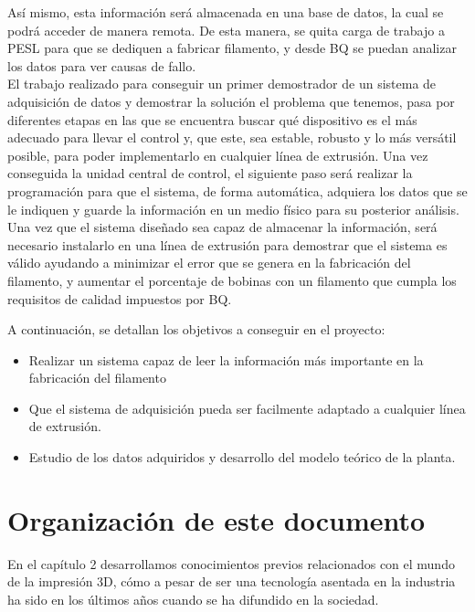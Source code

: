Así mismo, esta información será almacenada en una base de datos, la cual se podrá acceder de manera remota. De esta manera, se quita carga de trabajo a PESL para que se dediquen a fabricar filamento, y desde BQ se puedan analizar los datos para ver causas de fallo.\\

El trabajo realizado para conseguir un primer demostrador de un sistema de adquisición de datos y demostrar la solución el problema que tenemos, pasa por diferentes etapas en las que se encuentra buscar qué dispositivo es el más adecuado para llevar el control y, que este, sea estable, robusto y lo más versátil posible, para poder implementarlo en cualquier línea de extrusión. Una vez conseguida la unidad central de control, el siguiente paso será realizar la programación para que el sistema, de forma automática, adquiera los datos que se le indiquen y guarde la información en un medio físico para su posterior análisis.\\

Una vez que el sistema diseñado sea capaz de almacenar la información, será necesario instalarlo en una línea de extrusión para demostrar que el sistema es válido ayudando a minimizar el error que se genera en la fabricación del filamento, y aumentar el porcentaje de bobinas con un filamento que cumpla los requisitos de calidad impuestos por BQ.

A continuación, se detallan los objetivos a conseguir en el proyecto:

\begin{itemize}
    \item Realizar un sistema capaz de leer la información más importante en la fabricación del filamento
    \item Que el sistema de adquisición pueda ser facilmente adaptado a cualquier línea de extrusión.
    \item Estudio de los datos adquiridos y desarrollo del modelo teórico de la planta.
\end{itemize}
\label{Listado_objetivos}

\section{Organización de este documento}
\label{sec:organizacion}

En el capítulo 2 desarrollamos conocimientos previos relacionados con el mundo de la impresión 3D, cómo a pesar de ser una tecnología asentada en la industria ha sido en los últimos años cuando se ha difundido en la sociedad.\\

